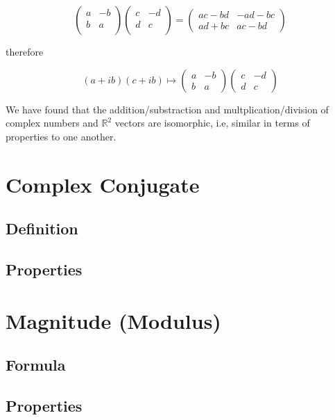 \documentclass[12pt]{article}
\newcommand{\R}{{\mathbb{R}}}
\begin{document}
    \[
        \begin{pmatrix}
            a & -b\\
            b & a \\
        \end{pmatrix}
        \begin{pmatrix}
            c & -d \\
            d & c \\
        \end{pmatrix} = 
        \begin{pmatrix}
            ac-bd & -ad-bc\\
            ad + bc & ac -bd 
        \end{pmatrix}
    \]

    therefore

    \[
        (a + ib)(c + ib) \mapsto \begin{pmatrix}
            a & -b \\
            b & a
        \end{pmatrix}  
        \begin{pmatrix}
            c & -d \\
            d & c
        \end{pmatrix}
    \]

    We have found that the addition/substraction and multplication/division of 
    complex numbers and $\R^2$ vectors are isomorphic, i.e, similar in terms of 
    properties to one another. 

    \section{Complex Conjugate}
    \subsection{Definition}
    \subsection{Properties}

    \section{Magnitude (Modulus)}
    \subsection{Formula}
    \subsection{Properties}
\end{document}
